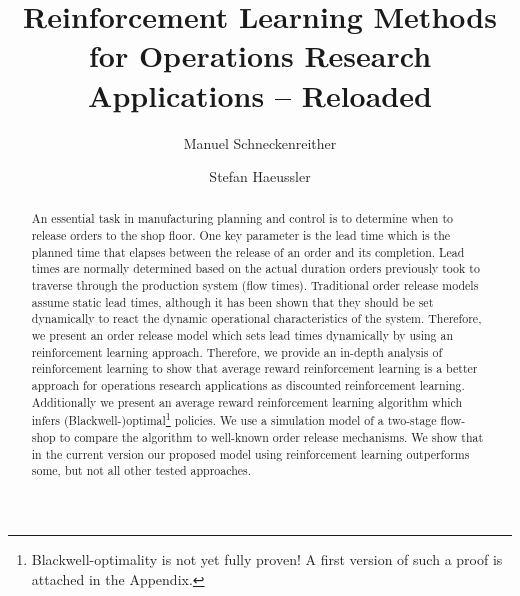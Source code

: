\documentclass[envcountsame]{llncs}
\title{
  Reinforcement Learning Methods for Operations Research Applications -- Reloaded
}
\author{Manuel Schneckenreither%
  \and Stefan Haeussler%
}
\institute{
  Department of Information Systems,
  Production and Logistics Management,
  University of Innsbruck, Austria\\
  email: \email{manuel.schneckenreither@uibk.ac.at,stefan.haeussler@uibk.ac.at}
}
\newcommand{\SH}[1]{\begin{center} \textcolor{green!50!black}{#1} \end{center}}
\begin{document}
\maketitle

\begin{abstract}
  An essential task in manufacturing planning and control is to determine when to release orders to
  the shop floor. One key parameter is the lead time which is the planned time that elapses between
  the release of an order and its completion. Lead times are normally determined based on the actual
  duration orders previously took to traverse through the production system (flow times).
  Traditional order release models assume static lead times, although it has been shown that they
  should be set dynamically to react the dynamic operational characteristics of the system.
  Therefore, we present an order release model which sets lead times dynamically by using an
  reinforcement learning approach. Therefore, we provide an in-depth analysis of reinforcement
  learning to show that average reward reinforcement learning is a better approach for operations
  research applications as discounted reinforcement learning. Additionally we present an average
  reward reinforcement learning algorithm which infers
  (Blackwell-)optimal\footnote{Blackwell-optimality is not yet fully proven! A first version of such
    a proof is attached in the Appendix.} policies.
  We use a simulation model of a two-stage flow-shop to compare the algorithm
  to %
  well-known order release mechanisms. We show that in the current version our proposed model using
  reinforcement learning outperforms some, but not all other tested approaches.
\end{abstract}
\end{document}
